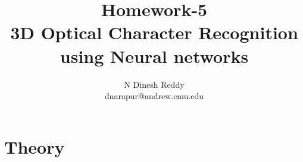 \documentclass[12pt]{article}
\newenvironment{problem}[2][Problem]{\begin{trivlist}
\item[\hskip \labelsep {\bfseries #1}\hskip \labelsep {\bfseries #2.}]}{\end{trivlist}}
\begin{document}
 
 
\title{Homework-5 \\ 3D Optical Character Recognition using Neural networks}
\author{N Dinesh Reddy \\ dnarapur@andrew.cmu.edu }

\newpage

\maketitle

\section{Theory}

\begin{problem}{1.1}
\end{problem}
\begin{problem}{1.4}

\end{problem}
\newpage
\section{}

\begin{problem}{2.1}
\end{problem}

\begin{problem}{2.2}
\end{problem}

\begin{problem}{2X}
\end{problem}

\begin{problem}{2.3}

\end{problem}
\begin{problem}{2.4}
\end{problem}
\begin{problem}{2.5}
\end{problem} 
\end{document}
